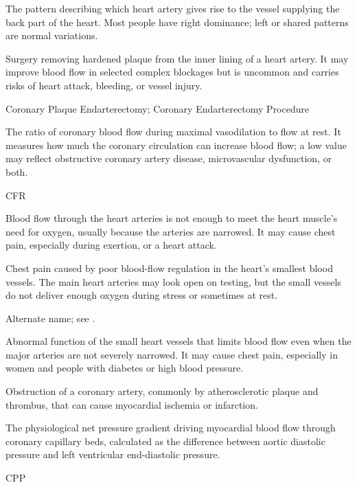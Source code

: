  The pattern describing which heart artery gives rise to the vessel supplying the back part of the heart. Most people have right dominance; left or shared patterns are normal variations.

 Surgery removing hardened plaque from the inner lining of a heart artery. It may improve blood flow in selected complex blockages but is uncommon and carries risks of heart attack, bleeding, or vessel injury.

\synonyms
Coronary Plaque Endarterectomy; Coronary Endarterectomy Procedure

 The ratio of coronary blood flow during maximal vasodilation to flow at rest. It measures how much the coronary circulation can increase blood flow; a low value may reflect obstructive coronary artery disease, microvascular dysfunction, or both.

\synonyms
CFR

 Blood flow through the heart arteries is not enough to meet the heart muscle's need for oxygen, usually because the arteries are narrowed. It may cause chest pain, especially during exertion, or a heart attack.

 Chest pain caused by poor blood-flow regulation in the heart's smallest blood vessels. The main heart arteries may look open on testing, but the small vessels do not deliver enough oxygen during stress or sometimes at rest.

 Alternate name; see .

 Abnormal function of the small heart vessels that limits blood flow even when the major arteries are not severely narrowed. It may cause chest pain, especially in women and people with diabetes or high blood pressure.

 Obstruction of a coronary artery, commonly by atherosclerotic plaque and thrombus, that
can cause myocardial ischemia or infarction.

 The physiological net pressure gradient driving myocardial blood flow through coronary capillary beds, calculated as the difference between aortic diastolic pressure and left ventricular end-diastolic pressure.

\synonyms
CPP

